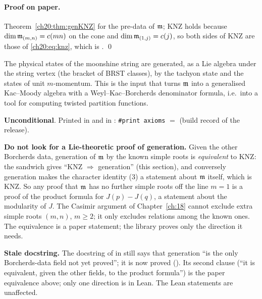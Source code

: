 \paragraph{Proof on paper.}  Theorem~\ref{ch20:thm:genKNZ} for the pre-data of $\mathfrak m$; KNZ holds because
$\dim\mathfrak m_{(m,n)}=c(mn)$ on the cone and $\dim\mathfrak m_{(1,j)}=c(j)$, so both sides of KNZ are those of
\eqref{ch20:eq:knz}, which is . \qed
\begin{physics}
The physical states of the moonshine string are generated, as a Lie algebra under the string vertex (the bracket of
BRST classes), by the tachyon state and the states of unit $m$-momentum.  This is the input that turns $\mathfrak m$ into a
generalised Kac--Moody algebra with a Weyl--Kac--Borcherds denominator formula, i.e.\ into a tool for computing twisted
partition functions.
\end{physics}
\begin{status}
\textbf{Unconditional}.  Printed in  and in
: \texttt{\#print axioms} $=$ 
(build record of the release).
\end{status}

\begin{warning}
\textbf{Do not look for a Lie-theoretic proof of generation.}  Given the other Borcherds
data, generation of $\mathfrak m$ by the known simple roots is \emph{equivalent} to KNZ: the sandwich gives
``KNZ $\Rightarrow$ generation'' (this section), and conversely generation makes the character identity (3) a statement about
$\mathfrak m$ itself, which is KNZ.  So any proof that $\mathfrak m$ has no further simple roots off the line $m=1$ is a proof of
the product formula for $J(p)-J(q)$, a statement about the modularity of $J$.  The Casimir argument of Chapter~\ref{ch:18}
cannot exclude extra simple roots $(m,n)$, $m\ge2$; it only excludes relations among the known ones.  The equivalence is
a paper statement; the library proves only the direction it needs.
\end{warning}
\begin{warning}
\textbf{Stale docstring.}  The docstring of  in
 still says that generation ``is the only Borcherds-data field not
yet proved''; it is now proved ().  Its second clause (``it is
equivalent, given the other fields, to the product formula'') is the paper equivalence above; only one direction is in Lean.
The Lean statements are unaffected.
\end{warning}

